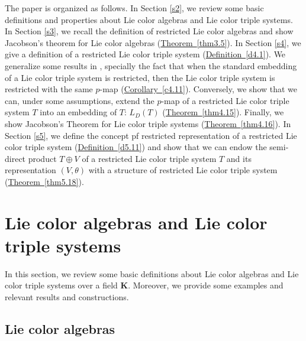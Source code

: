 \documentclass[11pt, twoside]{article}
\begin{document}

The paper is organized as follows. In Section \eqref{s2}, we  review some basic definitions and properties about Lie color algebras and Lie color triple systems. In Section \eqref{s3}, we recall the definition of restricted Lie color algebras and show  Jacobson's theorem for Lie color algebras (\hyperref[thm3.5]{Theorem~\ref*{thm3.5}}). In Section \eqref{s4}, we give a definition of a restricted Lie color triple system (\hyperref[d4.1]{Definition~\ref*{d4.1}}). We generalize some results in \cite{H01}, specially the fact that when the standard embedding of a Lie color triple system is restricted, then the Lie color triple system is restricted with the same $p$-map (\hyperref[c4.11]{Corollary~\ref*{c4.11}}). Conversely, we show that we can, under some assumptions, extend the $p$-map of a restricted Lie color triple system $T$ into an embedding of $T$: $L_D(T)$ (\hyperref[thm4.15]{Theorem~\ref*{thm4.15}}). Finally, we show Jacobson's Theorem for Lie color triple systems (\hyperref[thm4.16]{Theorem~\ref*{thm4.16}}). In Section \eqref{s5}, we define the concept pf restricted representation of a restricted Lie color triple system (\hyperref[d5.11]{Definition~\ref*{d5.11}}) and show that we can endow the semi-direct product $T\oplus V $ of a restricted Lie color triple system $T$ and its representation $(V,\theta) $ with a structure of restricted Lie color triple system (\hyperref[thm5.18]{Theorem~\ref*{thm5.18}}).

\section{Lie color algebras and Lie color triple systems}\label{s2}

In this section, we review some basic  definitions about Lie color algebras and Lie color triple systems over a field $\mathbf{K} $. Moreover, we provide some examples and relevant results and constructions.

\subsection{Lie color algebras}
\end{document}
